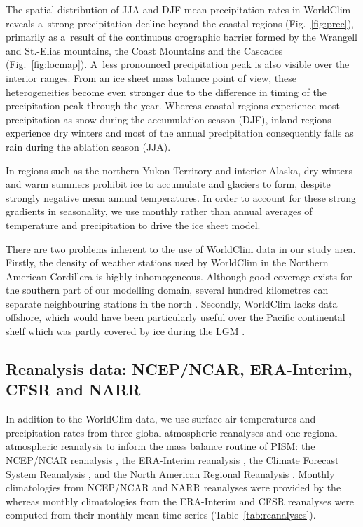 \documentclass[tc, ms]{copernicus}
\begin{document}
The spatial distribution of JJA and DJF mean precipitation rates in WorldClim reveals a~strong precipitation decline beyond the coastal regions (Fig.~\ref{fig:prec}), primarily as a~result of the continuous orographic barrier formed by the Wrangell and St.-Elias mountains, the Coast Mountains and the Cascades (Fig.~\ref{fig:locmap}). A~less pronounced precipitation peak is also visible over the interior ranges. From an ice sheet mass balance point of view, these heterogeneities become even stronger due to the difference in timing of the precipitation peak through the year. Whereas coastal regions experience most precipitation as snow during the accumulation season (DJF), inland regions experience dry winters and most of the annual precipitation consequently falls as rain during the ablation season (JJA).

In regions such as the northern Yukon Territory and interior Alaska, dry winters and warm summers prohibit ice to accumulate and glaciers to form, despite strongly negative mean annual temperatures. In order to account for these strong gradients in seasonality, we use monthly rather than annual averages of temperature and precipitation to drive the ice sheet model.

There are two problems inherent to the use of WorldClim data in our study area. Firstly, the density of weather stations used by WorldClim in the Northern American Cordillera is highly inhomogeneous. Although good coverage exists for the southern part of our modelling domain, several hundred kilometres can separate neighbouring stations in the north \citep{data:worldclim}. Secondly, WorldClim lacks data offshore, which would have been particularly useful over the Pacific continental shelf which was partly covered by ice during the LGM \citep{jackson-clague-1991}.

\subsection{Reanalysis data: NCEP/NCAR, ERA-Interim, CFSR and NARR}

In addition to the WorldClim data, we use surface air temperatures and precipitation rates from three global atmospheric reanalyses and one regional atmospheric reanalysis to inform the mass balance routine of PISM: the NCEP/NCAR reanalysis \citep{data:ncar}, the ERA-Interim reanalysis \citep{data:erai}, the Climate Forecast System Reanalysis \citep[CFSR;][]{data:cfsr}, and the North American Regional Reanalysis \citep[NARR;][]{data:narr}. Monthly climatologies from NCEP/NCAR and NARR reanalyses were provided by the \citet{web:psd} whereas monthly climatologies from the ERA-Interim and CFSR reanalyses were computed from their monthly mean time series (Table~\ref{tab:reanalyses}).
\end{document}
